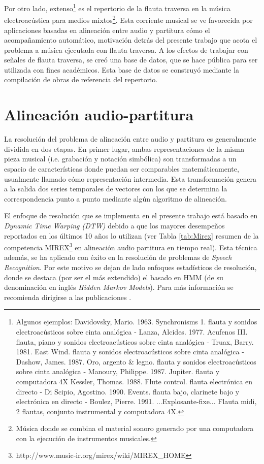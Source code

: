 \documentclass
  [ams,pdfout]%
	{aeslac}
\begin{document}
%
Por otro lado, extenso\footnote{Algunos ejemplos: Davidovsky, Mario. 1963. Synchronisms 1. flauta y sonidos electroacústicos sobre cinta analógica - Lanza, Alcides. 1977. Acufenos III. flauta, piano y sonidos electroacústicos sobre cinta analógica - Truax, Barry. 1981. East Wind. flauta y sonidos electroacústicos sobre cinta analógica - Dashow, James. 1987. Oro, argento \& legno. flauta y sonidos electroacústicos sobre cinta analógica - Manoury, Philippe. 1987. Jupiter. flauta y computadora 4X Kessler, Thomas. 1988. Flute control. flauta electrónica en directo - Di Scipio, Agostino. 1990. Events. flauta bajo, clarinete bajo y electrónica en directo - Boulez, Pierre. 1991. ...Explosante-fixe... Flauta midi, 2 flautas, conjunto instrumental y computadora 4X.}  es el repertorio de la flauta traversa en la música electroacústica para medios mixtos\footnote{Música donde se combina el material sonoro generado por una computadora con la ejecución de instrumentos musicales.}. Esta corriente musical se ve favorecida por aplicaciones basadas en alineación entre audio y partitura cómo el acompañamiento automático, motivación detrás del presente trabajo que acota el problema a música ejecutada con flauta traversa. A los efectos de trabajar con señales de flauta traversa, se creó una base de datos, que se hace pública para ser utilizada con fines académicos. Esta base de datos se construyó mediante la compilación de obras de referencia del repertorio.

%
\section{Alineación audio-partitura}

La resolución del problema de alineación entre audio y partitura es generalmente dividida en dos etapas. En primer lugar, ambas representaciones de la misma pieza musical (i.e. grabación y notación simbólica) son transformadas a un espacio de características donde puedan ser comparables matemáticamente, usualmente llamado cómo representación intermedia. Esta transformación genera a la salida dos series temporales de vectores con los que se determina la correspondencia punto a punto mediante algún algoritmo de alineación.

El enfoque de resolución que se implementa en el presente trabajo está basado en \textit{Dynamic Time Warping (DTW)} debido a que los mayores desempeños reportados en los últimos 10 años lo utilizan (ver Tabla \ref{tab:Mirex} resumen de la competencia MIREX\footnote{http://www.music-ir.org/mirex/wiki/MIREX\_HOME} en alineación audio partitura en tiempo real). Esta técnica además, se ha aplicado con éxito en la resolución de problemas de \textit{Speech Recognition}. Por este motivo se dejan de lado enfoques estadísticos de resolución, donde se destaca (por ser el más extendido) el basado en HMM (de su denominación en inglés \textit{Hidden Markov Models}). Para más información se recomienda dirigirse a las publicaciones \cite{montecchio2009discrete,raphael1999automatic,orio2001score}. 
\end{document}

